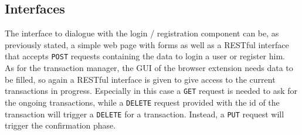 \subsection{Interfaces}
The interface to dialogue with the login / registration component can be, as previously stated, a simple web page with forms as well as a RESTful interface that accepts {\tt POST} requests containing the data to login a user or register him.\\
As for the transaction manager, the GUI of the browser extension needs data to be filled, so again a RESTful interface is given to give access to the current transactions in progress. Especially in this case a {\tt GET} request is needed to ask for the ongoing transactions, while a {\tt DELETE} request provided with the id of the transaction will trigger a {\tt DELETE} for a transaction. Instead, a {\tt PUT} request will trigger the confirmation phase.
